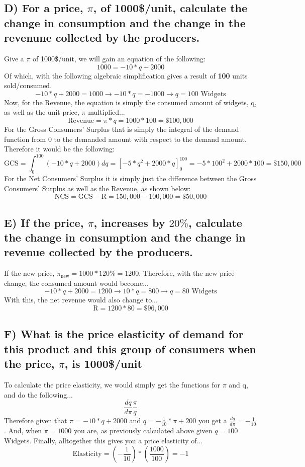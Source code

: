 \documentclass{article}
\begin{document}
\subsection{D) For a price, $\pi$, of 1000\$/unit, calculate the change in consumption and the change in the revenune collected by the producers.}
Give a $\pi$ of 1000\$/unit, we will gain an equation of the following:
$$ 1000 = -10*q + 2000 $$
Of which, with the following algebraic simplification gives a result of \textbf{100} units sold/consumed.
$$ -10*q + 2000 = 1000 \rightarrow -10*q = -1000 \rightarrow q = 100 \text{ Widgets}$$
Now, for the Revenue, the equation is simply the consumed amount of widgets, q, as well as the unit price, $\pi$ multiplied...
$$ \text{Revenue} = \pi * q = 1000 * 100 = \$100,000 $$
For the Gross Consumers' Surplus that is simply the integral of the demand function from 0 to the demanded amount with respect to the demand amount. Therefore it would be the following:
$$ \text{GCS} = \int_{0}^{100}(-10*q + 2000)dq = [-5*q^2 + 2000*q]_{0}^{100} = -5*100^2 + 2000*100 = \$150,000 $$
For the Net Consumers' Surplus it is simply just the difference between the Gross Consumers' Surplus as well as the Revenue, as shown below:
$$ \text{NCS} = \text{GCS} - \text{R} = 150,000 - 100,000 = \$50,000 $$

\subsection{E) If the price, $\pi$, increases by $20\%$, calculate the change in consumption and the change in revenue collected by the producers.}
If the new price, $\pi_{\text{new}} = 1000 * 120\% = 1200$. Therefore, with the new price change, the consumed amount would become...
$$ -10*q + 2000 = 1200 \rightarrow 10*q = 800 \rightarrow q = 80 \text{ Widgets} $$
With this, the net revenue would also change to...
$$ \text{R} = 1200*80 = \$96,000 $$

\subsection{F) What is the price elasticity of demand for this product and this group of consumers when the price, $\pi$, is 1000\$/unit}
To calculate the price elasticity, we would simply get the functions for $\pi$ and q, and do the following...
$$ \frac{dq}{d\pi}\frac{\pi}{q}$$
Therefore given that $\pi = -10*q + 2000$ and $q = -\frac{1}{10}*\pi + 200$ you get a $\frac{dq}{d\pi} = -\frac{1}{10}$. And, when $\pi = 1000$ you are, as previously calculated above given $q = 100$ Widgets. Finally, alltogether this gives you a price elasticity of...
$$ \text{Elasticity} = (-\frac{1}{10})*(\frac{1000}{100}) = -1 $$
\end{document}
